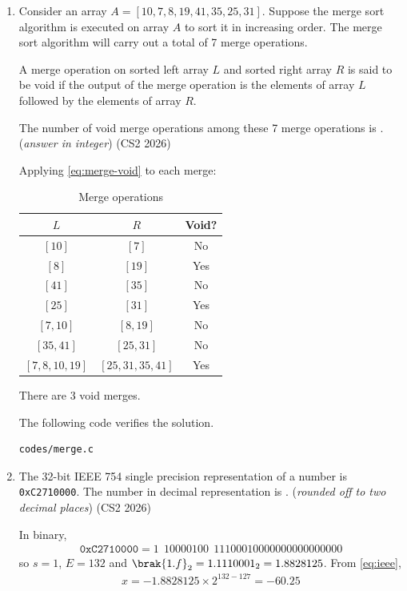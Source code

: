 \begin{enumerate}[label=\thesubsection.\arabic*, ref=\thesubsection.\theenumi]
\item Consider an array $A = [10, 7, 8, 19, 41, 35, 25, 31]$. Suppose the
merge sort algorithm is executed on array $A$ to sort it in increasing
order. The merge sort algorithm will carry out a total of 7 merge
operations.

A merge operation on sorted left array $L$ and sorted right array $R$ is
said to be void if the output of the merge operation is the elements of
array $L$ followed by the elements of array $R$.

The number of void merge operations among these 7 merge operations is
\underline{\hspace{1.5cm}}. (\textit{answer in integer})
\hfill (CS2 2026)

\solution Applying \eqref{eq:merge-void} to each merge:
\begin{table}[H]
\centering
\begin{tabular}{|c|c|c|}
\hline
$L$ & $R$ & \textbf{Void?} \\
\hline
$[10]$ & $[7]$ & No \\
$[8]$ & $[19]$ & Yes \\
$[41]$ & $[35]$ & No \\
$[25]$ & $[31]$ & Yes \\
$[7, 10]$ & $[8, 19]$ & No \\
$[35, 41]$ & $[25, 31]$ & No \\
$[7, 8, 10, 19]$ & $[25, 31, 35, 41]$ & Yes \\
\hline
\end{tabular}
\caption{Merge operations}
\end{table}
There are $3$ void merges.

The following code verifies the solution.
\begin{lstlisting}
codes/merge.c
\end{lstlisting}

\item The 32-bit IEEE 754 single precision representation of a number is
\texttt{0xC2710000}. The number in decimal representation is
\underline{\hspace{1.5cm}}. (\textit{rounded off to two decimal places})
\hfill (CS2 2026)

\solution In binary,
\begin{align}
\texttt{0xC2710000} = 1 \ \ 10000100 \ \ 11100010000000000000000
\end{align}
so $s = 1$, $E = 132$ and $\brak{1.f}_2 = 1.1110001_2 = 1.8828125$. From
\eqref{eq:ieee},
\begin{align}
x = -1.8828125 \times 2^{132 - 127} = -60.25
\end{align}


\end{enumerate}
